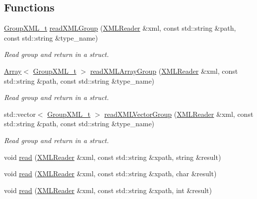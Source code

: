 \subsection*{Functions}
\begin{DoxyCompactItemize}
\item 
\mbox{\hyperlink{structADATXML_1_1GroupXML__t}{Group\+X\+M\+L\+\_\+t}} \mbox{\hyperlink{group__io_ga55d25898ac653a77ea446bee3682d29b}{read\+X\+M\+L\+Group}} (\mbox{\hyperlink{classADATXML_1_1XMLReader}{X\+M\+L\+Reader}} \&xml, const std\+::string \&path, const std\+::string \&type\+\_\+name)
\begin{DoxyCompactList}\small\item\em Read group and return in a struct. \end{DoxyCompactList}\item 
\mbox{\hyperlink{classXMLArray_1_1Array}{Array}}$<$ \mbox{\hyperlink{structADATXML_1_1GroupXML__t}{Group\+X\+M\+L\+\_\+t}} $>$ \mbox{\hyperlink{group__io_gadf35620dfa0c46f11572a9ffb3452847}{read\+X\+M\+L\+Array\+Group}} (\mbox{\hyperlink{classADATXML_1_1XMLReader}{X\+M\+L\+Reader}} \&xml, const std\+::string \&path, const std\+::string \&type\+\_\+name)
\begin{DoxyCompactList}\small\item\em Read group and return in a struct. \end{DoxyCompactList}\item 
std\+::vector$<$ \mbox{\hyperlink{structADATXML_1_1GroupXML__t}{Group\+X\+M\+L\+\_\+t}} $>$ \mbox{\hyperlink{group__io_ga3cd8ca33a23f0e4eafde989d168b8247}{read\+X\+M\+L\+Vector\+Group}} (\mbox{\hyperlink{classADATXML_1_1XMLReader}{X\+M\+L\+Reader}} \&xml, const std\+::string \&path, const std\+::string \&type\+\_\+name)
\begin{DoxyCompactList}\small\item\em Read group and return in a struct. \end{DoxyCompactList}\item 
void \mbox{\hyperlink{namespaceADATXML_a569ed4d03ded383a8aaf0ce90b7c80ba}{read}} (\mbox{\hyperlink{classADATXML_1_1XMLReader}{X\+M\+L\+Reader}} \&xml, const std\+::string \&xpath, string \&result)
\item 
void \mbox{\hyperlink{group__io_ga42921d40fdc242e0dc6200a66c1eb928}{read}} (\mbox{\hyperlink{classADATXML_1_1XMLReader}{X\+M\+L\+Reader}} \&xml, const std\+::string \&xpath, char \&result)
\item 
void \mbox{\hyperlink{group__io_ga0e33dbc1e3ebc33bfb45ef5f1b390e45}{read}} (\mbox{\hyperlink{classADATXML_1_1XMLReader}{X\+M\+L\+Reader}} \&xml, const std\+::string \&xpath, int \&result)

\end{DoxyCompactItemize}
